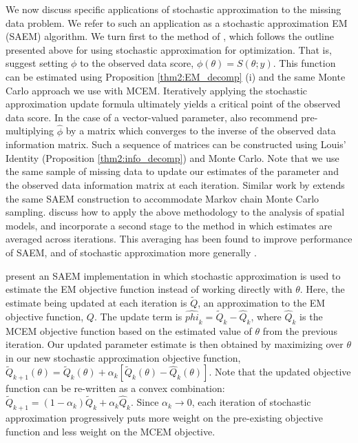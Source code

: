 \documentclass[11pt, oneside]{article}   	%
\begin{document}
We now discuss specific applications of stochastic approximation to the missing data problem. We refer to such an application as a stochastic approximation EM (SAEM) algorithm. We turn first to the method of \citet{Gu98I}, which follows the outline presented above for using stochastic approximation for optimization. That is, \citeauthor{Gu98I} suggest setting $\phi$ to the observed data score, $\phi(\theta) = S(\theta; y)$. This function can be estimated using Proposition \ref{thm2:EM_decomp} (i) and the same Monte Carlo approach we use with MCEM. Iteratively applying the stochastic approximation update formula ultimately yields a critical point of the observed data score. In the case of a vector-valued parameter, \citeauthor{Gu98I} also recommend pre-multiplying $\hat{\phi}$ by a matrix which converges to the inverse of the observed data information matrix. Such a sequence of matrices can be constructed using Louis' Identity (Proposition \ref{thm2:info_decomp}) and Monte Carlo. Note that we use the same sample of missing data to update our estimates of the parameter and the observed data information matrix at each iteration. Similar work by \citet{Gu98II} extends the same SAEM construction to accommodate Markov chain Monte Carlo sampling. \citet{Gu01} discuss how to apply the above methodology to the analysis of spatial models, and incorporate a second stage to the method in which estimates are averaged across iterations. This averaging has been found to improve performance of SAEM, and of stochastic approximation more generally \citep{Pol92, Del99}.

\citet{Dey99} present an SAEM implementation in which stochastic approximation is used to estimate the EM objective function instead of working directly with $\theta$. Here, the estimate being updated at each iteration is $\tilde{Q}$, an approximation to the EM objective function, $Q$. The update term is $\hat{phi}_k = \tilde{Q}_k - \hat{Q}_k$, where $\hat{Q}_k$ is the MCEM objective function based on the estimated value of $\theta$ from the previous iteration. Our updated parameter estimate is then obtained by maximizing over $\theta$ in our new stochastic approximation objective function, $\tilde{Q}_{k+1}(\theta) = \tilde{Q}_k(\theta) + \alpha_k [ \tilde{Q}_k(\theta) - \hat{Q}_k(\theta)]$. Note that the updated objective function can be re-written as a convex combination: $\tilde{Q}_{k+1} = (1 - \alpha_k) \tilde{Q}_k + \alpha_k \hat{Q}_k$. Since $\alpha_k \rightarrow 0$, each iteration of stochastic approximation progressively puts more weight on the pre-existing objective function and less weight on the MCEM objective.
\end{document}
